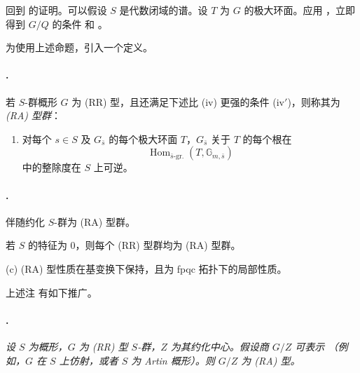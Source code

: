 回到  的证明。可以假设 \(S\) 是代数闭域的谱。设 \(T\) 为 \(G\) 的极大环面。应用 ，立即得到 \(G/Q\) 的条件 \textup{} 和 \textup{}。

为使用上述命题，引入一个定义。

\paragraph{.}
若 \(S\)-群概形 \(G\) 为 \textup{(RR)} 型，且还满足下述比 \textup{(iv)} 更强的条件 \textup{(iv$'$)}，则称其为 \emph{\textup{(RA)} 型群}：
\begin{enumerate}
\item[\textup{(iv$'$)}]
对每个 \(s\in S\) 及 \(G_{\bar s}\) 的每个极大环面 \(T\)，\(G_{\bar s}\) 关于 \(T\) 的每个根在
\[
  \operatorname{Hom}_{\bar s\text{-gr.}}
    (T,\mathbb G_{m,\bar s})
\]
中的整除度在 \(S\) 上可逆。
\end{enumerate}

\paragraph{.}
\textup{} 伴随约化 \(S\)-群为 \textup{(RA)} 型群。

\textup{} 若 \(S\) 的特征为 \(0\)，则每个 \textup{(RR)} 型群均为 \textup{(RA)} 型群。

\textup{(c)} \textup{(RA)} 型性质在基变换下保持，且为 fpqc 拓扑下的局部性质。

上述注 \textup{} 有如下推广。

\paragraph{.}
\textit{设 \(S\) 为概形，\(G\) 为 \textup{(RR)} 型 \(S\)-群，\(Z\) 为其约化中心。假设商 \(G/Z\) 可表示 \textup{（例如，\(G\) 在 \(S\) 上仿射，或者 \(S\) 为 Artin 概形）}。则 \(G/Z\) 为 \textup{(RA)} 型。}


